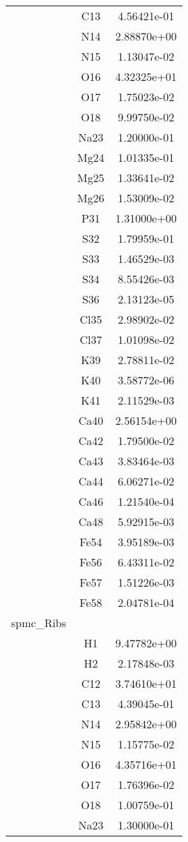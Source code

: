 \begin{centering}
\begin{longtable}{l c c}
& C13 & 4.56421e-01 \\ 
& N14 & 2.88870e+00 \\ 
& N15 & 1.13047e-02 \\ 
& O16 & 4.32325e+01 \\ 
& O17 & 1.75023e-02 \\ 
& O18 & 9.99750e-02 \\ 
& Na23 & 1.20000e-01 \\ 
& Mg24 & 1.01335e-01 \\ 
& Mg25 & 1.33641e-02 \\ 
& Mg26 & 1.53009e-02 \\ 
& P31 & 1.31000e+00 \\ 
& S32 & 1.79959e-01 \\ 
& S33 & 1.46529e-03 \\ 
& S34 & 8.55426e-03 \\ 
& S36 & 2.13123e-05 \\ 
& Cl35 & 2.98902e-02 \\ 
& Cl37 & 1.01098e-02 \\ 
& K39 & 2.78811e-02 \\ 
& K40 & 3.58772e-06 \\ 
& K41 & 2.11529e-03 \\ 
& Ca40 & 2.56154e+00 \\ 
& Ca42 & 1.79500e-02 \\ 
& Ca43 & 3.83464e-03 \\ 
& Ca44 & 6.06271e-02 \\ 
& Ca46 & 1.21540e-04 \\ 
& Ca48 & 5.92915e-03 \\ 
& Fe54 & 3.95189e-03 \\ 
& Fe56 & 6.43311e-02 \\ 
& Fe57 & 1.51226e-03 \\ 
& Fe58 & 2.04781e-04 \\ 
\hline
spmc\_Ribs & & \\
\hline
& H1 & 9.47782e+00 \\ 
& H2 & 2.17848e-03 \\ 
& C12 & 3.74610e+01 \\ 
& C13 & 4.39045e-01 \\ 
& N14 & 2.95842e+00 \\ 
& N15 & 1.15775e-02 \\ 
& O16 & 4.35716e+01 \\ 
& O17 & 1.76396e-02 \\ 
& O18 & 1.00759e-01 \\ 
& Na23 & 1.30000e-01 \\ 

\end{longtable}
\end{centering}
